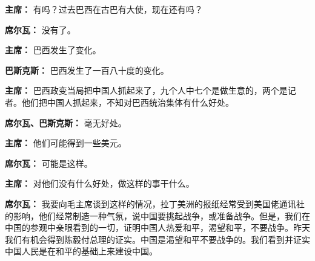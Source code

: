 \begin{list}{}
\item[\textbf{主席：}] 有吗？过去巴西在古巴有大使，现在还有吗？

\item[\textbf{席尔瓦：}] 没有了。

\item[\textbf{主席：}] 巴西发生了变化。

\item[\textbf{巴斯克斯：}] 巴西发生了一百八十度的变化。

\item[\textbf{主席：}] 巴西政变当局把中国人抓起来了，九个人中七个是做生意的，两个是记者。他们把中国人抓起来，不知对巴西统治集体有什么好处。

\item[\textbf{席尔瓦、巴斯克斯：}] 毫无好处。

\item[\textbf{主席：}] 他们可能得到一些美元。

\item[\textbf{席尔瓦：}] 可能是这样。

\item[\textbf{主席：}] 对他们没有什么好处，做这样的事干什么。

\item[\textbf{席尔瓦：}] 我要向毛主席谈到这样的情况，拉丁美洲的报纸经常受到美国佬通讯社的影响，他们经常制造一种气氛，说中国要挑起战争，或准备战争。但是，我们在中国的参观中亲眼看到的一切，证明中国人热爱和平，渴望和平，不要战争。昨天我们有机会得到陈毅付总理的证实。中国是渴望和平不要战争的。我们看到并证实中国人民是在和平的基础上来建设中国。


\end{list}

